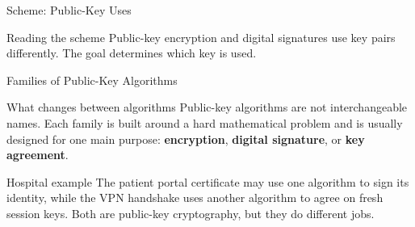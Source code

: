 \documentclass[presentation]{beamer}
\begin{document}
\begin{frame}[c]{Scheme: Public-Key Uses}
\begin{center}
\end{center}

\begin{block}{Reading the scheme}
Public-key encryption and digital signatures use key pairs differently. The goal determines which
key is used.
\end{block}
\end{frame}

\begin{frame}[c]{Families of Public-Key Algorithms}
\begin{block}{What changes between algorithms}
Public-key algorithms are not interchangeable names. Each family is built around a hard mathematical
problem and is usually designed for one main purpose: \textbf{encryption}, \textbf{digital
signature}, or \textbf{key agreement}.
\end{block}

\begin{exampleblock}{Hospital example}
The patient portal certificate may use one algorithm to sign its identity, while the VPN handshake
uses another algorithm to agree on fresh session keys. Both are public-key cryptography, but they do
different jobs.
\end{exampleblock}
\end{frame}
\end{document}
